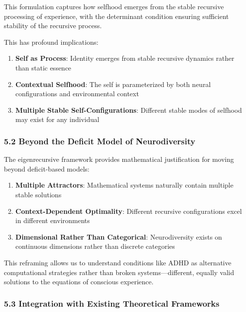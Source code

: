 \documentclass[
]{article}
\providecommand{\tightlist}{%
  \setlength{\itemsep}{0pt}\setlength{\parskip}{0pt}}
\begin{document}
This formulation captures how selfhood emerges from the stable recursive
processing of experience, with the determinant condition ensuring
sufficient stability of the recursive process.

This has profound implications:

\begin{enumerate}
\def\labelenumi{\arabic{enumi}.}
\tightlist
\item
  \textbf{Self as Process}: Identity emerges from stable recursive
  dynamics rather than static essence
\item
  \textbf{Contextual Selfhood}: The self is parameterized by both neural
  configurations and environmental context
\item
  \textbf{Multiple Stable Self-Configurations}: Different stable modes
  of selfhood may exist for any individual
\end{enumerate}

\subsubsection{5.2 Beyond the Deficit Model of
Neurodiversity}\label{beyond-the-deficit-model-of-neurodiversity}

The eigenrecursive framework provides mathematical justification for
moving beyond deficit-based models:

\begin{enumerate}
\def\labelenumi{\arabic{enumi}.}
\tightlist
\item
  \textbf{Multiple Attractors}: Mathematical systems naturally contain
  multiple stable solutions
\item
  \textbf{Context-Dependent Optimality}: Different recursive
  configurations excel in different environments
\item
  \textbf{Dimensional Rather Than Categorical}: Neurodiversity exists on
  continuous dimensions rather than discrete categories
\end{enumerate}

This reframing allows us to understand conditions like ADHD as
alternative computational strategies rather than broken
systems---different, equally valid solutions to the equations of
conscious experience.

\subsubsection{5.3 Integration with Existing Theoretical
Frameworks}\label{integration-with-existing-theoretical-frameworks}
\end{document}
